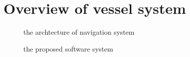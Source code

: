 \documentclass[lettersize,journal]{IEEEtran}
\begin{document}
\section{Overview of vessel system}
\begin{figure}[H]
  \begin{center}
  \end{center}
  \caption{the archtecture of navigation system}
  \label{fig:arch_nav}
\end{figure}

\begin{figure}[H]
  \begin{center}
  \end{center}
  \caption{the proposed software system}
  \label{fig:pss}
\end{figure}
\end{document}
